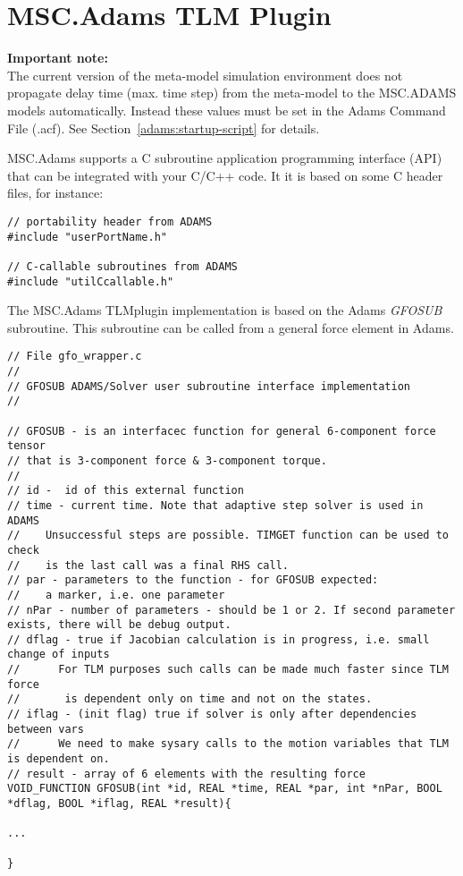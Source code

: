 \chapter{MSC.Adams TLM Plugin}

{\bf Important note:}\\ The current version of the meta-model
simulation environment does not propagate delay time (max. time step)
from the meta-model to the MSC.ADAMS models automatically. Instead
these values must be set in the Adams Command File (.acf). See
Section~\ref{adams:startup-script} for details.


MSC.Adams supports a C subroutine application programming interface
(API) that can be integrated with your C/C++ code. It it is based
on some C header files, for instance:

{
\scriptsize
\begin{verbatim}
// portability header from ADAMS
#include "userPortName.h"

// C-callable subroutines from ADAMS
#include "utilCcallable.h"
\end{verbatim}
}


The MSC.Adams TLMplugin implementation is based on the Adams {\em
  GFOSUB} subroutine. This subroutine can be called from a general
force element in Adams.

{
\scriptsize
\begin{verbatim}
// File gfo_wrapper.c
//
// GFOSUB ADAMS/Solver user subroutine interface implementation
//

// GFOSUB - is an interfacec function for general 6-component force tensor
// that is 3-component force & 3-component torque.
//
// id -  id of this external function
// time - current time. Note that adaptive step solver is used in ADAMS
//    Unsuccessful steps are possible. TIMGET function can be used to check
//    is the last call was a final RHS call.
// par - parameters to the function - for GFOSUB expected:
//    a marker, i.e. one parameter
// nPar - number of parameters - should be 1 or 2. If second parameter exists, there will be debug output.
// dflag - true if Jacobian calculation is in progress, i.e. small change of inputs
//      For TLM purposes such calls can be made much faster since TLM force
//       is dependent only on time and not on the states.
// iflag - (init flag) true if solver is only after dependencies between vars
//      We need to make sysary calls to the motion variables that TLM is dependent on.
// result - array of 6 elements with the resulting force
VOID_FUNCTION GFOSUB(int *id, REAL *time, REAL *par, int *nPar, BOOL *dflag, BOOL *iflag, REAL *result){

...

}
\end{verbatim}
}

